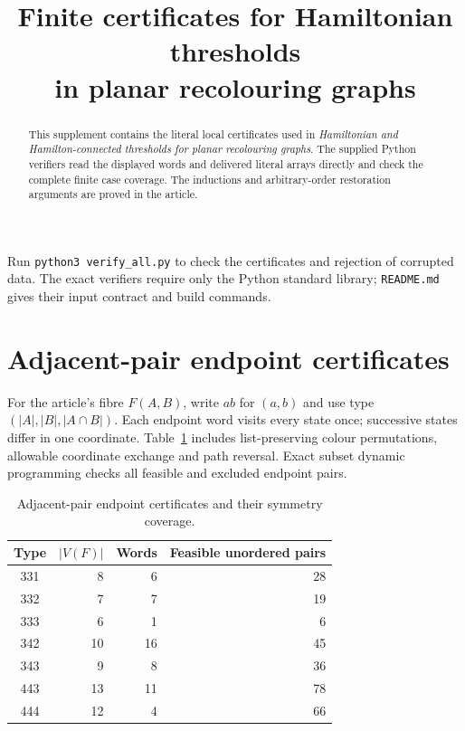 \documentclass[11pt]{article}
\title{Finite certificates for Hamiltonian thresholds\\in planar recolouring graphs}
\author{}
\date{}
\numberwithin{equation}{section}
\numberwithin{table}{section}
\begin{document}
\maketitle
\begin{abstract}
This supplement contains the literal local certificates used in
\emph{Hamiltonian and Hamilton-connected thresholds for planar recolouring graphs}.
The supplied Python verifiers read the displayed words and delivered
literal arrays directly and check the
complete finite case coverage. The inductions and arbitrary-order
restoration arguments are proved in the article.
\end{abstract}
Run \texttt{python3 verify\_all.py} to check the certificates and rejection
of corrupted data. The exact verifiers require only the Python standard
library; \texttt{README.md} gives their input contract and build commands.
\appendix
\section{Adjacent-pair endpoint certificates}
\label{app:pair-five-certificates}
For the article's fibre $F(A,B)$, write $ab$ for $(a,b)$ and use type
$(|A|,|B|,|A\cap B|)$. Each endpoint word visits every state once;
successive states differ in one coordinate. Table~\ref{tab:pair-five-counts}
includes list-preserving colour permutations, allowable coordinate
exchange and path reversal. Exact subset dynamic programming checks
all feasible and excluded endpoint pairs.

\begin{table}[htbp]
\centering
\caption{Adjacent-pair endpoint certificates and their symmetry coverage.}
\label{tab:pair-five-counts}
\begin{tabular}{crrr}
\toprule
Type & $|V(F)|$ & Words & Feasible unordered pairs\\
\midrule
 331&8&6&28\\
 332&7&7&19\\
 333&6&1&6\\
 342&10&16&45\\
 343&9&8&36\\
 443&13&11&78\\
 444&12&4&66\\
\bottomrule
\end{tabular}
\end{table}
\end{document}
